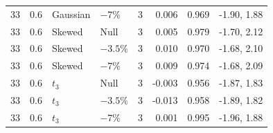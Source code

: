 \begin{table}[H]
\begin{tabular*}{\textwidth}{@{\extracolsep{\fill}}rrllrrrr}
33 & 0.6 & Gaussian & $-7\%$ & 3 & 0.006 & 0.969 & -1.90, 1.88 \\
33 & 0.6 & Skewed & Null & 3 & 0.005 & 0.979 & -1.70, 2.12 \\
33 & 0.6 & Skewed & $-3.5\%$ & 3 & 0.010 & 0.970 & -1.68, 2.10 \\
33 & 0.6 & Skewed & $-7\%$ & 3 & 0.009 & 0.974 & -1.68, 2.09 \\
33 & 0.6 & $t_3$ & Null & 3 & -0.003 & 0.956 & -1.87, 1.83 \\
33 & 0.6 & $t_3$ & $-3.5\%$ & 3 & -0.013 & 0.958 & -1.89, 1.82 \\
33 & 0.6 & $t_3$ & $-7\%$ & 3 & 0.001 & 0.995 & -1.96, 1.88 \\
\bottomrule
\end{tabular*}
\end{table}

